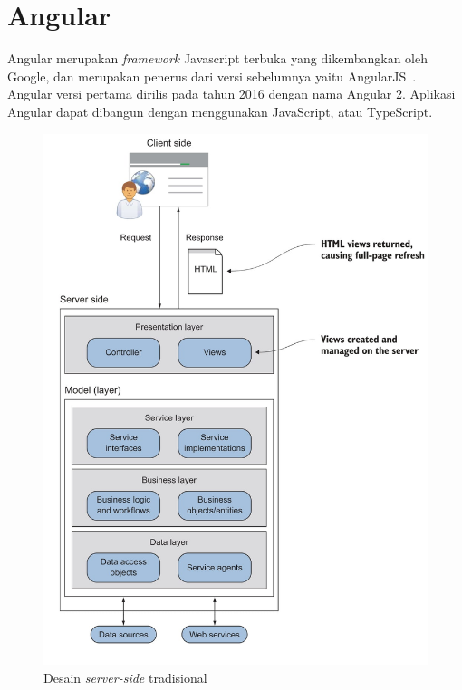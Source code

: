 \section{Angular}
\label{sec:angular} 
Angular merupakan \textit{framework} Javascript terbuka yang dikembangkan oleh Google, dan merupakan penerus dari versi sebelumnya yaitu AngularJS~\cite{fain:18:angular}. Angular versi pertama dirilis pada tahun 2016 dengan nama Angular 2. Aplikasi Angular dapat dibangun dengan menggunakan JavaScript, atau TypeScript.

\begin{figure}[H]
		\centering
	    \includegraphics[scale=0.9]{Gambar/tradisionaldesain.png}
	    \caption{Desain \textit{server-side} tradisional~\cite{scott:15:spa}}
	    \label{fig:tradisionaldesain}
\end{figure}

